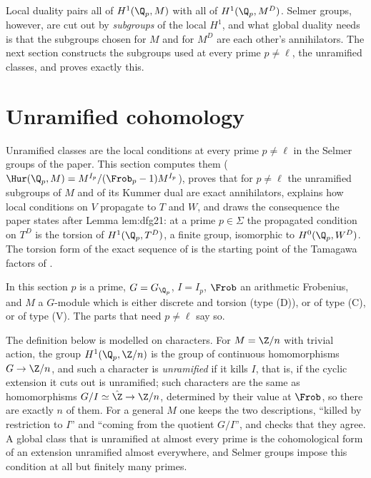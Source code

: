 Local duality pairs all of $H^1(\Q_p,M)$ with all of $H^1(\Q_p,M^D)$. Selmer groups, however, are cut out by \emph{subgroups} of the local $H^1$, and what global duality
needs is that the subgroups chosen for $M$ and for $M^D$ are each other's annihilators. The next section constructs the subgroups used at every prime $p\ne\ell$, the
unramified classes, and proves exactly this.
\section{Unramified cohomology}\label{sec:galcoh:unramified}

Unramified classes are the local conditions at every prime $p\ne\ell$ in the Selmer groups of the paper. This section computes them
($\Hur(\Q_p,M)=M^{I_p}/(\Frob_p-1)M^{I_p}$), proves that for $p\ne\ell$ the unramified subgroups of $M$ and of its Kummer dual are exact annihilators, explains how local
conditions on $V$ propagate to $T$ and $W$, and draws the consequence the paper states after Lemma lem:dfg21: at a prime $p\in\Sigma$ the propagated condition
on $T^D$ is the torsion of $H^1(\Q_p,T^D)$, a finite group, isomorphic to $H^0(\Q_p,W^D)$. The torsion form of the exact sequence of 
is the starting point of the Tamagawa factors of .

In this section $p$ is a prime, $G=G_{\Q_p}$, $I=I_p$, $\Frob$ an arithmetic Frobenius, and $M$ a $G$-module which is either discrete and torsion (type (D)), or of
type (C), or of type (V). The parts that need $p\ne\ell$ say so.

The definition below is modelled on characters. For $M=\Z/n$ with trivial action, the group $H^1(\Q_p,\Z/n)$ is the group of continuous homomorphisms
$G\to\Z/n$, and such a character is \emph{unramified} if it kills $I$, that is, if the cyclic extension it cuts out is unramified; such characters are the same as homomorphisms $G/I\simeq\hat\Z\to\Z/n$, determined by their value at
$\Frob$, so there are exactly $n$ of them. For a general $M$ one keeps the two descriptions, ``killed by restriction to $I$'' and ``coming from the quotient $G/I$'', and
checks that they agree. A global class that is unramified at almost every prime is the cohomological form of an extension unramified almost everywhere, and Selmer
groups impose this condition at all but finitely many primes.

